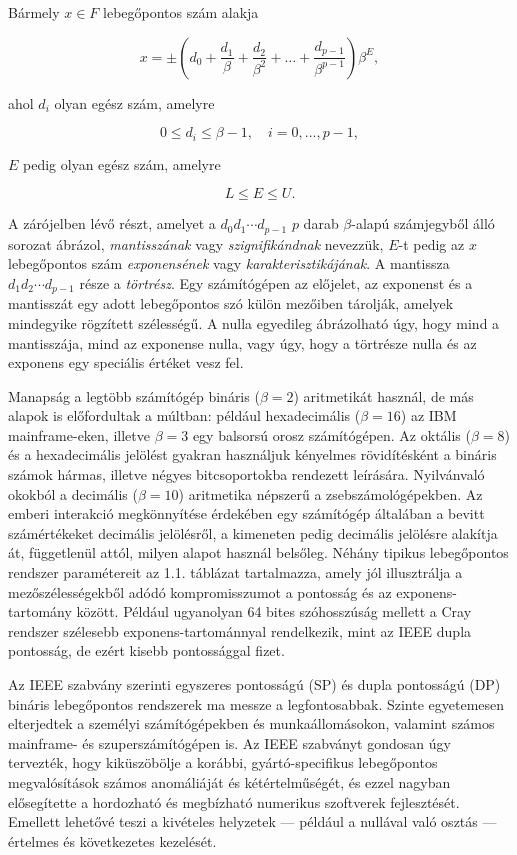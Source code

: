 \documentclass[
  magyar,
  11pt]{article}
\begin{document}
Bármely \(x \in F\) lebegőpontos szám alakja

\[x = \pm \left(d_0 + \frac{d_1}{\beta} + \frac{d_2}{\beta^2} + \dots + \frac{d_{p-1}}{\beta^{p-1}}\right) \beta^E,\]

ahol \(d_i\) olyan egész szám, amelyre

\[0 \le d_i \le \beta - 1, \quad i = 0, \dots, p - 1,\]

\(E\) pedig olyan egész szám, amelyre

\[L \leq E \leq U.\]

A zárójelben lévő részt, amelyet a \(d_0 d_1 \cdots d_{p-1}\) \(p\)
darab \(\beta\)-alapú számjegyből álló sorozat ábrázol,
\emph{mantisszának} vagy \emph{szignifikándnak} nevezzük, \(E\)-t pedig
az \(x\) lebegőpontos szám \emph{exponensének} vagy
\emph{karakterisztikájának}. A mantissza \(d_1 d_2 \cdots d_{p-1}\)
része a \emph{törtrész}. Egy számítógépen az előjelet, az exponenst és a
mantisszát egy adott lebegőpontos szó külön mezőiben tárolják, amelyek
mindegyike rögzített szélességű. A nulla egyedileg ábrázolható úgy, hogy
mind a mantisszája, mind az exponense nulla, vagy úgy, hogy a törtrésze
nulla és az exponens egy speciális értéket vesz fel.

Manapság a legtöbb számítógép bináris (\(\beta = 2\)) aritmetikát
használ, de más alapok is előfordultak a múltban: például hexadecimális
(\(\beta = 16\)) az IBM mainframe-eken, illetve \(\beta = 3\) egy
balsorsú orosz számítógépen. Az oktális (\(\beta = 8\)) és a
hexadecimális jelölést gyakran használjuk kényelmes rövidítésként a
bináris számok hármas, illetve négyes bitcsoportokba rendezett
leírására. Nyilvánvaló okokból a decimális (\(\beta = 10\)) aritmetika
népszerű a zsebszámológépekben. Az emberi interakció megkönnyítése
érdekében egy számítógép általában a bevitt számértékeket decimális
jelölésről, a kimeneten pedig decimális jelölésre alakítja át,
függetlenül attól, milyen alapot használ belsőleg. Néhány tipikus
lebegőpontos rendszer paramétereit az 1.1. táblázat tartalmazza, amely
jól illusztrálja a mezőszélességekből adódó kompromisszumot a pontosság
és az exponens-tartomány között. Például ugyanolyan 64 bites
szóhosszúság mellett a Cray rendszer szélesebb exponens-tartománnyal
rendelkezik, mint az IEEE dupla pontosság, de ezért kisebb pontossággal
fizet.

Az IEEE szabvány szerinti egyszeres pontosságú (SP) és dupla pontosságú
(DP) bináris lebegőpontos rendszerek ma messze a legfontosabbak. Szinte
egyetemesen elterjedtek a személyi számítógépekben és munkaállomásokon,
valamint számos mainframe- és szuperszámítógépen is. Az IEEE szabványt
gondosan úgy tervezték, hogy kiküszöbölje a korábbi, gyártó-specifikus
lebegőpontos megvalósítások számos anomáliáját és kétértelműségét, és
ezzel nagyban elősegítette a hordozható és megbízható numerikus
szoftverek fejlesztését. Emellett lehetővé teszi a kivételes helyzetek
--- például a nullával való osztás --- értelmes és következetes
kezelését.
\end{document}
